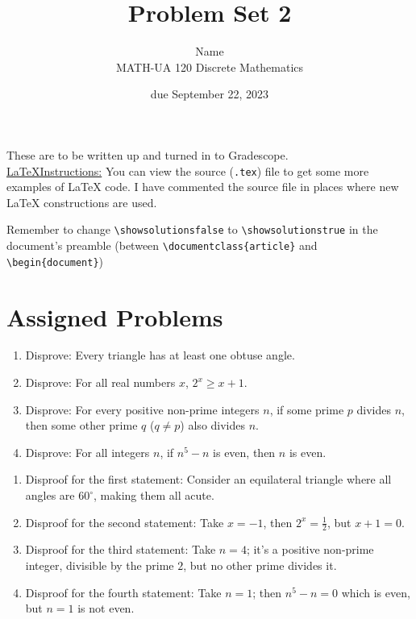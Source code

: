 \documentclass{article}
\title{Problem Set 2}
\author{%
    Name
\\  MATH-UA 120 Discrete Mathematics
}
\date{due September 22, 2023}
\newif\ifshowsolutions
\newcommand{\danger}{\marginpar[\hfill\dbend]{\dbend\hfill}}
\theoremstyle{definition}
\begin{document}
\maketitle



These are to be written up and turned in to Gradescope.\\



\ifshowsolutions
    \SetupExSheets{solution/print=true}
\else
    \danger
 \underline{ \LaTeX  Instructions:}  You can view the source (\texttt{.tex}) file to get some more examples of \LaTeX{} code.  I have commented the source file in places where new \LaTeX{} constructions are used.
  
  Remember to change \verb|\showsolutionsfalse| to \verb|\showsolutionstrue|
    in the document's preamble 
    (between \verb|\documentclass{article}| and \verb|\begin{document}|)
\fi

\section*{Assigned Problems}


\begin{question}
    \begin{enumerate}
        \item Disprove: Every triangle has at least one obtuse angle.
        \item Disprove: For all real numbers $x$, $2^x\geq x+1$.
        \item Disprove: For every positive non-prime integers $n$, if some prime $p$ divides $n$, 
            then some other prime $q$ ($q\neq p$) also divides $n$.
        \item Disprove: For all integers $n$, if $n^5-n$ is even, then $n$ is even.
    \end{enumerate}
\end{question}
\begin{solution}
    \begin{enumerate}
        \item Disproof for the first statement: Consider an equilateral triangle where all angles are $60^\circ$, making them all acute.
        \item Disproof for the second statement: Take $x = -1$, then $2^x = \frac{1}{2}$, but $x + 1 = 0$.
        \item Disproof for the third statement: Take $n = 4$; it's a positive non-prime integer, divisible by the prime $2$, but no other prime divides it.
        \item Disproof for the fourth statement: Take $n = 1$; then $n^5 - n = 0$ which is even, but $n = 1$ is not even.
    \end{enumerate}
\end{solution}
\end{document}
